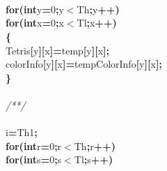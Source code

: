 \documentclass[a4paper, 10pt]{article}
\newcommand\SPC{\hspace*{0.6em}}
\newcommand\HYP{\mbox{\char 45}}
\newcommand{\CppAComment}[1]{\textit{\textcolor[rgb]{0.2,0.6,1}{#1}}}
\newcommand{\CppAIdentifier}[1]{#1}
\newcommand{\CppANumber}[1]{\textcolor[rgb]{0.5,0,0.5}{#1}}
\newcommand{\CppAReservedWord}[1]{\textbf{#1}}
\newcommand{\CppASpace}[1]{\colorbox[rgb]{1,1,1}{#1}}
\newcommand{\CppASymbol}[1]{\textbf{\textcolor[rgb]{1,0,0}{#1}}}
\begin{document}
\begin{ttfamily}
\\
\\
\\
\CppASpace{\SPC \SPC \SPC }\CppAReservedWord{for}\CppASymbol{(}\CppAReservedWord{int}\CppASpace{\SPC }\CppAIdentifier{y}\CppASymbol{=}\CppANumber{0}\CppASymbol{;}\CppAIdentifier{y}\CppASymbol{$<$}\CppAIdentifier{Th}\CppASymbol{;}\CppAIdentifier{y}\CppASymbol{++}\CppASymbol{)}\\
\CppASpace{\SPC \SPC \SPC \SPC }\CppAReservedWord{for}\CppASymbol{(}\CppAReservedWord{int}\CppASpace{\SPC }\CppAIdentifier{x}\CppASymbol{=}\CppANumber{0}\CppASymbol{;}\CppAIdentifier{x}\CppASymbol{$<$}\CppAIdentifier{Tl}\CppASymbol{;}\CppAIdentifier{x}\CppASymbol{++}\CppASymbol{)}\\
\CppASpace{\SPC \SPC \SPC \SPC }\CppASymbol{\{}\\
\CppASpace{\SPC \SPC \SPC \SPC \SPC \SPC }\CppAIdentifier{Tetris}\CppASymbol{[}\CppAIdentifier{y}\CppASymbol{]}\CppASymbol{[}\CppAIdentifier{x}\CppASymbol{]}\CppASymbol{=}\CppAIdentifier{temp}\CppASymbol{[}\CppAIdentifier{y}\CppASymbol{]}\CppASymbol{[}\CppAIdentifier{x}\CppASymbol{]}\CppASymbol{;}\\
\CppASpace{\SPC \SPC \SPC \SPC \SPC \SPC }\CppAIdentifier{colorInfo}\CppASymbol{[}\CppAIdentifier{y}\CppASymbol{]}\CppASymbol{[}\CppAIdentifier{x}\CppASymbol{]}\CppASymbol{=}\CppAIdentifier{tempColorInfo}\CppASymbol{[}\CppAIdentifier{y}\CppASymbol{]}\CppASymbol{[}\CppAIdentifier{x}\CppASymbol{]}\CppASymbol{;}\\
\CppASpace{\SPC \SPC \SPC \SPC }\CppASymbol{\}}\\
\\
\CppASpace{\SPC \SPC \SPC }\CppAComment{/*\HYP \HYP \HYP \HYP \HYP \HYP \HYP \HYP \HYP \HYP \HYP \HYP \HYP \HYP \HYP \HYP \HYP \HYP \HYP \HYP \HYP \HYP \HYP \HYP \HYP \HYP \HYP \HYP \HYP \HYP \HYP */}\\
\\
\CppASpace{\SPC \SPC \SPC }\CppAIdentifier{i}\CppASymbol{=}\CppAIdentifier{Th}\CppASymbol{\HYP }\CppANumber{1}\CppASymbol{;}\\
\CppASpace{\SPC \SPC \SPC }\CppAReservedWord{for}\CppASymbol{(}\CppAReservedWord{int}\CppASpace{\SPC }\CppAIdentifier{r}\CppASymbol{=}\CppANumber{0}\CppASymbol{;}\CppAIdentifier{r}\CppASymbol{$<$}\CppAIdentifier{Th}\CppASymbol{;}\CppAIdentifier{r}\CppASymbol{++}\CppASymbol{)}\\
\CppASpace{\SPC \SPC \SPC \SPC }\CppAReservedWord{for}\CppASymbol{(}\CppAReservedWord{int}\CppASpace{\SPC }\CppAIdentifier{s}\CppASymbol{=}\CppANumber{0}\CppASymbol{;}\CppAIdentifier{s}\CppASymbol{$<$}\CppAIdentifier{Tl}\CppASymbol{;}\CppAIdentifier{s}\CppASymbol{++}\CppASymbol{)}\\

\end{ttfamily}
\end{document}
